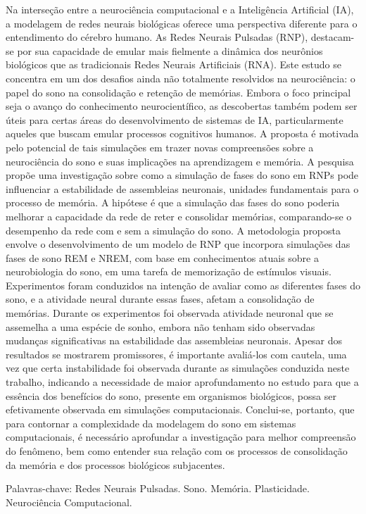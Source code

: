 \begin{resumo}
\noindent
 
Na interseção entre a neurociência computacional e a Inteligência Artificial (IA), a modelagem de redes neurais biológicas oferece
uma perspectiva diferente para o entendimento do cérebro humano. As Redes Neurais Pulsadas (RNP), destacam-se por sua capacidade
de emular mais fielmente a dinâmica dos neurônios biológicos que as tradicionais Redes Neurais Artificiais (RNA). Este estudo se
concentra em um dos desafios ainda não totalmente resolvidos na neurociência: o papel do sono na consolidação e retenção de
memórias. Embora o foco principal seja o avanço do conhecimento neurocientífico, as descobertas também podem ser úteis para certas
áreas do desenvolvimento de sistemas de IA, particularmente aqueles que buscam emular processos cognitivos humanos. A proposta é
motivada pelo potencial de tais simulações em trazer novas compreensões sobre a neurociência do sono e suas implicações na
aprendizagem e memória. A pesquisa propõe uma investigação sobre como a simulação de fases do sono em RNPs pode influenciar a
estabilidade de assembleias neuronais, unidades fundamentais para o processo de memória. A hipótese é que a simulação das fases do
sono poderia melhorar a capacidade da rede de reter e consolidar memórias, comparando-se o desempenho da rede com e sem a
simulação do sono. A metodologia proposta envolve o desenvolvimento de um modelo de RNP que incorpora simulações das fases de sono
REM e NREM, com base em conhecimentos atuais sobre a neurobiologia do sono, em uma tarefa de memorização de estímulos visuais.
Experimentos foram conduzidos na intenção de avaliar como as diferentes fases do sono, e a atividade neural durante essas fases,
afetam a consolidação de memórias. Durante os experimentos foi observada atividade neuronal que se assemelha a uma espécie de
sonho, embora não tenham sido observadas mudanças significativas na estabilidade das assembleias neuronais. Apesar dos resultados
se mostrarem promissores, é importante avaliá-los com cautela, uma vez que certa instabilidade foi observada durante as simulações
conduzida neste trabalho, indicando a necessidade de maior aprofundamento no estudo para que a essência dos benefícios do sono,
presente em organismos biológicos, possa ser efetivamente observada em simulações computacionais. Conclui-se, portanto, que para
contornar a complexidade da modelagem do sono em sistemas computacionais, é necessário aprofundar a investigação para melhor
compreensão do fenômeno, bem como entender sua relação com os processos de consolidação da memória e dos processos biológicos
subjacentes.

\vspace{0.2cm}   
Palavras-chave: Redes Neurais Pulsadas. Sono. Memória. Plasticidade. Neurociência Computacional. 
\end{resumo}
 
